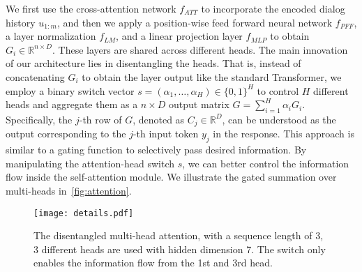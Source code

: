 \documentclass[11pt,a4paper]{article}
\begin{document}
We first use the cross-attention network $f_{ATT}$ to incorporate the encoded dialog history $u_{1:m}$, and then we apply a position-wise feed forward neural network $f_{PFF}$, a layer normalization $f_{LM}$, and a linear projection layer $f_{MLP}$ to obtain $G_i \in \mathbb{R}^{n \times D}$. These layers are shared across different heads. The main innovation of our architecture lies in disentangling the heads. That is, instead of concatenating $G_i$ to obtain the layer output like the standard Transformer, we employ a binary switch vector $s=(\alpha_1,\ldots,\alpha_H) \in \{0,1\}^{H}$ to control $H$ different heads and aggregate them as a $n \times D$ output matrix $G = \sum^H_{i=1} \alpha_i G_i$. Specifically, the $j$-th row of $G$, denoted as $C_j \in \mathbb{R}^D$, can be understood as the output corresponding to the $j$-th input token $y_j$ in the response. This approach is similar to a gating function to selectively pass desired information. By manipulating the attention-head switch $s$, we can better control the information flow inside the self-attention module. We illustrate the gated summation over multi-heads in~\autoref{fig:attention}.

\begin{figure}[thb]
    \begin{center}
    \texttt{[image: details.pdf]}
    \end{center}
    \vspace{-4ex}
    \caption{The disentangled multi-head attention, with a sequence length of 3, 3 different heads are used with hidden dimension 7. The switch only enables the information flow from the 1st and 3rd head.}
    \label{fig:attention}
\end{figure}
\end{document}

